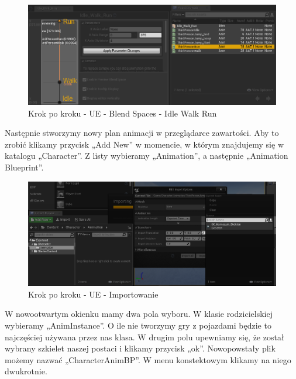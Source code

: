 \documentclass[openright]{xmgr}
\begin{document}
\begin{figure}[!htb]
    \begin{center}
    \includegraphics[scale=0.5]{Screeny/UeKrokPoKroku/UE-BlendSpace-IdleWalkRun.png}
    \end{center}
    \caption{Krok po kroku - UE - Blend Spaces - Idle Walk Run}
\end{figure}

Następnie stworzymy nowy plan animacji w przeglądarce zawartości. Aby to zrobić klikamy przycisk „Add New” w momencie, w którym znajdujemy się w katalogu „Character”. Z listy wybieramy „Animation”, a następnie „Animation Blueprint”.

\begin{figure}[!htb]
    \begin{center}
    \includegraphics[scale=0.35]{Screeny/UeKrokPoKroku/UE-Import.png}
    \end{center}
    \caption{Krok po kroku - UE - Importowanie}
\end{figure}

\newpage
W nowootwartym okienku mamy dwa pola wyboru. W klasie rodzicielskiej wybieramy „AnimInstance”. O ile nie tworzymy gry z pojazdami będzie to najczęściej używana przez nas klasa. W drugim polu upewniamy się, że został wybrany szkielet naszej postaci i klikamy przycisk „ok”. Nowopowstały plik możemy nazwać „CharacterAnimBP”. W menu konstektowym klikamy na niego dwukrotnie.
\end{document}
